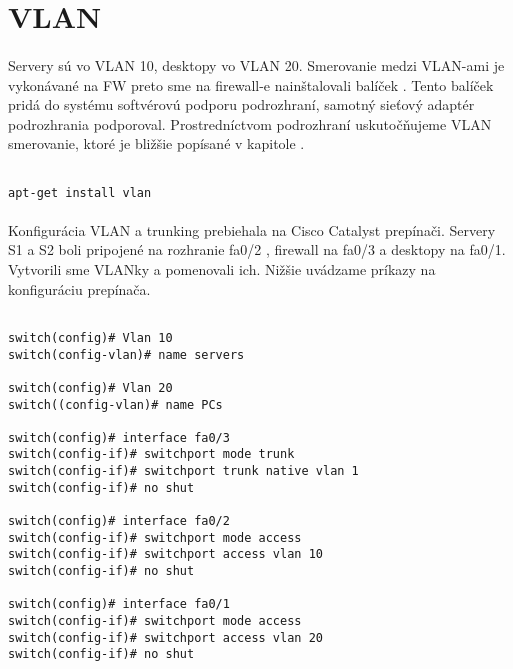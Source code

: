 \section{VLAN}
\paragraph{}
Servery sú vo VLAN 10, desktopy vo VLAN 20. Smerovanie medzi VLAN-ami je vykonávané na FW preto sme na firewall-e nainštalovali balíček . Tento balíček pridá do systému softvérovú podporu podrozhraní, samotný sieťový adaptér podrozhrania podporoval. Prostredníctvom podrozhraní uskutočňujeme VLAN smerovanie, ktoré je bližšie popísané v kapitole .

\noindent
{\selectfont
\begin{small}
\begin{verbatim}

apt-get install vlan

\end{verbatim}
\end{small}
}

\paragraph{}
Konfigurácia VLAN a trunking prebiehala na Cisco Catalyst prepínači. Servery S1 a S2 boli pripojené na rozhranie fa0/2 , firewall na fa0/3 a desktopy na fa0/1. Vytvorili sme VLANky a pomenovali ich. Nižšie uvádzame príkazy na konfiguráciu prepínača.


\noindent
{\selectfont

\begin{small}

\begin{verbatim}

switch(config)# Vlan 10
switch(config-vlan)# name servers

switch(config)# Vlan 20
switch((config-vlan)# name PCs

switch(config)# interface fa0/3
switch(config-if)# switchport mode trunk
switch(config-if)# switchport trunk native vlan 1
switch(config-if)# no shut

switch(config)# interface fa0/2
switch(config-if)# switchport mode access 
switch(config-if)# switchport access vlan 10
switch(config-if)# no shut

switch(config)# interface fa0/1
switch(config-if)# switchport mode access 
switch(config-if)# switchport access vlan 20
switch(config-if)# no shut

\end{verbatim}
\end{small}
}

